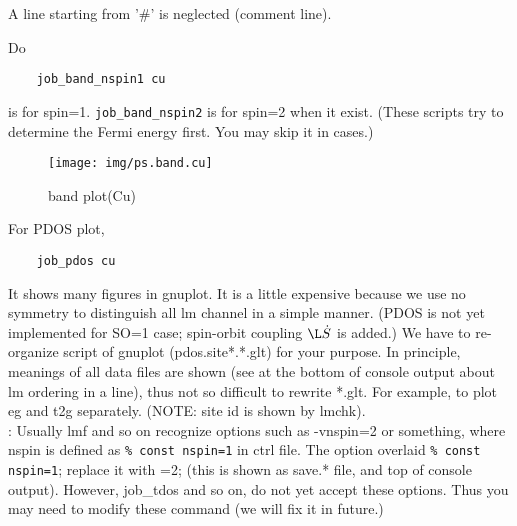 \documentclass[a4paper,10pt,epsf,fleqn]{article}
\begin{document}
A line starting from '\#' is neglected (comment line).

Do
\begin{verbatim}
    job_band_nspin1 cu
\end{verbatim}
is for spin=1. \verb+job_band_nspin2+ is for spin=2 when it exist.
(These scripts try to determine the Fermi energy first. You may skip it in cases.)

\begin{figure}[h]
 \begin{center}
  \texttt{[image: img/ps.band.cu]}
  \caption{band plot(Cu)}
 \end{center}
\end{figure}

For PDOS plot,
\begin{verbatim}
    job_pdos cu
\end{verbatim}
It shows many figures in gnuplot. It is a little expensive because we
use no symmetry to distinguish all lm channel in a simple manner.
(PDOS is not yet implemented for SO=1 case; spin-orbit coupling $\L\dot S$ is added.)
We have to re-organize script of gnuplot (pdos.site*.*.glt) for your purpose.
In principle, meanings of all data files are shown (see at the bottom
of console output about lm ordering in a line), thus not so difficult to
rewrite *.glt. For example, to plot eg and t2g separately. 
(NOTE: site id is shown by lmchk).\\

: Usually lmf and so on recognize options such as -vnspin=2 or
something, where nspin is defined as \verb+% const nspin=1+ in ctrl file.
The option overlaid \verb+% const nspin=1+; replace it with =2;
(this is shown as save.* file, and top of console output).
However, job\_tdos and so on, do not yet accept these options. Thus 
you may need to modify these command (we will fix it in future.)


\end{document}
